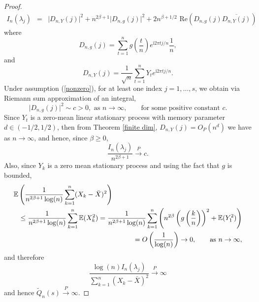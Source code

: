 \documentclass[12pt]{article}
\numberwithin{equation}{section}
\def\i{\mathrm{i}}
\begin{document}
\begin{proof}
\begin{eqnarray}\label{decomp}
I_n(\lambda_j)&=&\vert D_{n,Y}(j)\vert^2+n^{2\beta+1}\vert D_{n,g}(j)\vert^2
+2n^{\beta+1/2}\,\,\textrm{Re}\left(D_{n,g}(j)\overline{D_{n,Y}(j)}\right)
\end{eqnarray}
where
$$
D_{n,g}(j)=\sum_{t=1}^ng\left(\frac{t}{n}\right)e^{\i 2\pi t j/n}\frac{1}{n},
$$
and
$$
D_{n,Y}(j)=\frac{1}{\sqrt{ n}}\sum_{t=1}^nY_te^{\i 2\pi t j/n}.
$$
Under assumption (\ref{nonzero}), for at least one index $j=1,\ldots,s$, we obtain via  Riemann sum approximation of an integral,
$$
\vert D_{n,g}(j)\vert^2\sim c>0, \textrm{ as }n\to\infty,\qquad\textrm{for some positive constant }c.
$$
Since $Y_t$ is a zero-mean linear stationary process with memory parameter $d\in(-1/2,1/2)$, then from Theorem \ref{finite dim}, $D_{n,Y}(j)=O_P(n^d)$ we have as $n\to\infty$, and hence, since $\beta\ge0$,
\begin{equation}\label{num1}
\frac{I_n(\lambda_j)}{ n^{2\beta+1}}\overset{P}{\to}c.
\end{equation}
Also, since $Y_k$ is a zero mean stationary process and using the fact that $g$ is bounded,
\begin{eqnarray*}\lefteqn{
\mathbb{E}\left(\frac{1}{n^{2\beta+1}\log(n)}\sum_{k=1}^n(X_k-\bar X)^2\right)}\\
&&\le\frac{1}{n^{2\beta+1}\log(n)}\sum_{k=1}^n\mathbb{E}(X_k^2)=\frac{1}{n^{2\beta+1}\log(n)}\sum_{k=1}^n\left(n^{2\beta}\left(g\left(\frac{k}{n}\right)\right)^2+\mathbb{E}(Y_1^2)\right)\\ 
&&=O\left(\frac{1}{\log(n)}\right)\to0,\qquad\textrm{as }n\to\infty,
\end{eqnarray*}
and therefore
$$
\frac{\log(n)I_n(\lambda_j)}{\sum_{k=1}^n(X_k-\bar X)^2}\overset{P}{\to}\infty
$$
and hence $\tilde Q_n(s)\overset{P}{\to}\infty.$
\end{proof}

%
\end{document}
